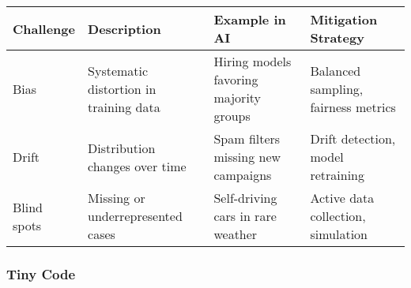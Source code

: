 \documentclass[
  letterpaper,
  DIV=11,
  numbers=noendperiod]{scrreprt}
\begin{document}
\begin{longtable}[]{@{}
  >{\raggedright\arraybackslash}p{}
  >{\raggedright\arraybackslash}p{}
  >{\raggedright\arraybackslash}p{}
  >{\raggedright\arraybackslash}p{}@{}}
\toprule\noalign{}
\begin{minipage}[b]{\linewidth}\raggedright
Challenge
\end{minipage} & \begin{minipage}[b]{\linewidth}\raggedright
Description
\end{minipage} & \begin{minipage}[b]{\linewidth}\raggedright
Example in AI
\end{minipage} & \begin{minipage}[b]{\linewidth}\raggedright
Mitigation Strategy
\end{minipage} \\
\midrule\noalign{}
\endhead
\bottomrule\noalign{}
\endlastfoot
Bias & Systematic distortion in training data & Hiring models favoring
majority groups & Balanced sampling, fairness metrics \\
Drift & Distribution changes over time & Spam filters missing new
campaigns & Drift detection, model retraining \\
Blind spots & Missing or underrepresented cases & Self-driving cars in
rare weather & Active data collection, simulation \\
\end{longtable}

\subsubsection{Tiny Code}\label{tiny-code-75}
\end{document}
